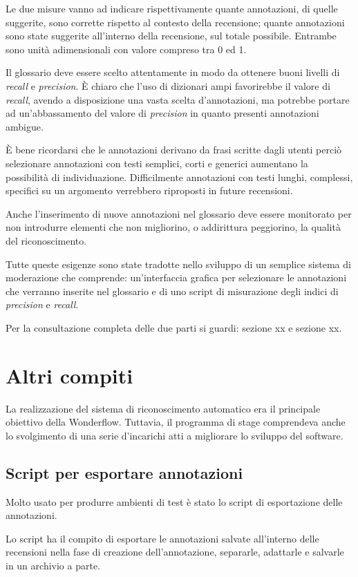 Le due misure vanno ad indicare rispettivamente quante annotazioni, di quelle
suggerite, sono corrette rispetto al contesto della recensione; quante
annotazioni sono state suggerite all'interno della recensione, sul totale
possibile. Entrambe sono unità adimensionali con valore compreso tra 0 ed 1.

Il glossario deve essere scelto attentamente in modo da ottenere buoni livelli
di \textit{recall} e \textit{precision}. È chiaro che l'uso di dizionari ampi
favorirebbe il valore di \textit{recall}, avendo a disposizione una vasta scelta
d'annotazioni, ma potrebbe portare ad un'abbassamento del valore di
\textit{precision} in quanto presenti annotazioni ambigue.

È bene ricordarsi che le annotazioni derivano da frasi scritte dagli utenti
perciò selezionare annotazioni con testi semplici, corti e generici aumentano
la possibilità di individuazione. Difficilmente annotazioni con testi lunghi,
complessi, specifici su un argomento verrebbero riproposti in future recensioni.

Anche l'inserimento di nuove annotazioni nel glossario deve essere monitorato
per non introdurre elementi che non migliorino, o addirittura peggiorino, la
qualità del riconoscimento.

Tutte queste esigenze sono state tradotte nello sviluppo di un semplice sistema
di moderazione che comprende: un'interfaccia grafica per selezionare le
annotazioni che verranno inserite nel glossario e di uno \gls{script} di
misurazione degli indici di \textit{precision} e \textit{recall}.

Per la consultazione completa delle due parti si guardi: sezione xx e sezione
xx.

\section{Altri compiti}
La realizzazione del sistema di riconoscimento automatico era il principale
obiettivo della Wonderflow. Tuttavia, il programma di stage comprendeva anche lo
svolgimento di una serie d'incarichi atti a migliorare lo sviluppo del software.

\subsection{Script per esportare annotazioni}
Molto usato per produrre ambienti di test è stato lo \gls{script} di
esportazione delle annotazioni.

Lo \gls{script} ha il compito di esportare le annotazioni salvate all'interno
delle recensioni nella fase di creazione dell'annotazione, separarle, adattarle
e salvarle in un archivio a parte.

